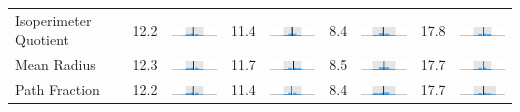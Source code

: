 \begin{table}
\begin{tabular}{l rm{7em} rm{7em} rm{7em} rm{7em}}
Isoperimeter Quotient  &  12.2 &       \includegraphics[width=7em]{mini_hist/TX_senate_2008_polsby} &  11.4 &       \includegraphics[width=7em]{mini_hist/TX_senate_2012_polsby} &   8.4 &       \includegraphics[width=7em]{mini_hist/TX_senate_2014_polsby} &  17.8 &       \includegraphics[width=7em]{mini_hist/TX_senate_2018_polsby} \\
Mean Radius            &  12.3 &  \includegraphics[width=7em]{mini_hist/TX_senate_2008_mean_radius} &  11.7 &  \includegraphics[width=7em]{mini_hist/TX_senate_2012_mean_radius} &   8.5 &  \includegraphics[width=7em]{mini_hist/TX_senate_2014_mean_radius} &  17.7 &  \includegraphics[width=7em]{mini_hist/TX_senate_2018_mean_radius} \\
Path Fraction          &  12.2 &    \includegraphics[width=7em]{mini_hist/TX_senate_2008_path_frac} &  11.4 &    \includegraphics[width=7em]{mini_hist/TX_senate_2012_path_frac} &   8.4 &    \includegraphics[width=7em]{mini_hist/TX_senate_2014_path_frac} &  17.7 &    \includegraphics[width=7em]{mini_hist/TX_senate_2018_path_frac} \\

\end{tabular}
\end{table}
